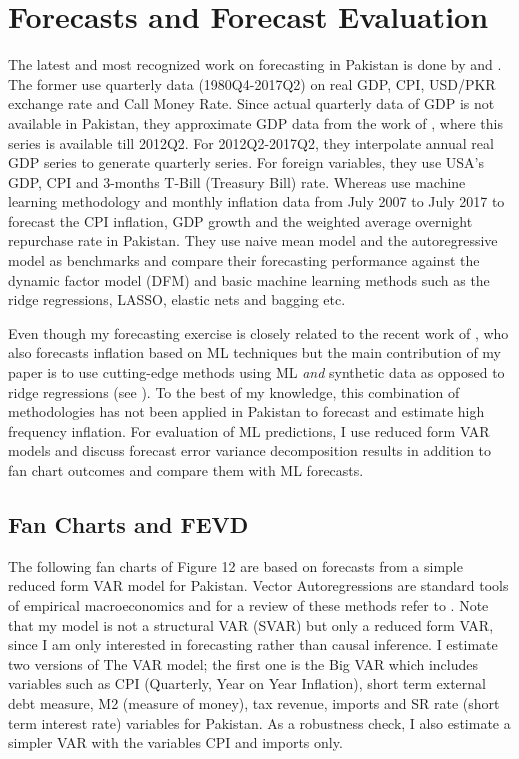 \documentclass[12pt]{article}
\newcommand{\1}{\mathbbm 1}
\begin{document}
		
		\section{Forecasts and Forecast Evaluation}
		
		
		
		The latest and most recognized work on forecasting in Pakistan is done by \cite{ahmad2019evaluation} and \cite{syed2021macroeconomic}. The former use quarterly data (1980Q4-2017Q2) on real GDP, CPI, USD/PKR exchange rate and Call Money Rate. Since actual quarterly data of GDP is not available in Pakistan, they approximate GDP data from the work of \cite{hanif2018thick}, where this series is available till 2012Q2. For 2012Q2-2017Q2, they interpolate annual real GDP series to generate quarterly series. For foreign variables, they use USA's GDP, CPI and 3-months T-Bill (Treasury Bill) rate.  Whereas \cite{syed2021macroeconomic} use machine learning methodology and monthly inflation data from July 2007 to July 2017 to forecast the CPI inflation, GDP growth and the weighted average overnight repurchase rate in Pakistan. They use naive mean model and the autoregressive model as benchmarks and compare their forecasting performance against the dynamic factor model (DFM) and basic machine learning methods such as the ridge regressions, LASSO, elastic nets and bagging etc.
		
		Even though my forecasting exercise is closely related to the recent work of \cite{syed2021macroeconomic}, who also forecasts inflation based on ML techniques but the main contribution of my paper is to use cutting-edge methods using ML \textit{and} synthetic data as opposed to ridge regressions (see \cite{syed2021macroeconomic}). To the best of my knowledge, this combination of methodologies has not been applied in Pakistan to forecast and estimate high frequency inflation. For evaluation of ML predictions, I use reduced form VAR models and discuss forecast error variance decomposition results in addition to fan chart outcomes and compare them with ML forecasts.
		
		\subsection{Fan Charts and FEVD}
			
		The following fan charts of Figure 12 are based on forecasts from a simple reduced form VAR model for Pakistan. Vector Autoregressions are standard tools of empirical macroeconomics and for a review of these methods refer to \cite{walsh2017monetary}. Note that my model is not a structural VAR (SVAR) but only a reduced form VAR, since I am only interested in forecasting rather than causal inference. I estimate two versions of The VAR model; the first one is the Big VAR which includes variables such as CPI (Quarterly, Year on Year Inflation), short term external debt measure, M2 (measure of money), tax revenue, imports and SR rate (short term interest rate) variables for Pakistan. As a robustness check, I also estimate a simpler VAR with the variables CPI and imports only. 
		
\end{document}

